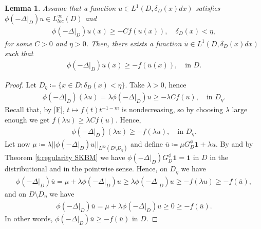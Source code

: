 \documentclass[12pt,a4paper,onecolumn]{amsart}
\newtheorem{lem}[thm]{Lemma}
\theoremstyle{definition}
\newcommand{\1}{\mathbf 1}
\newcommand{\LLL}{L^1(D,\de(x)dx)}
\newcommand{\Lo}{\phi(-\left.\Delta\right\vert_{D})}
\newcommand{\GDfi}{G^\phi_{ D}}
\newcommand{\GDFI}{\GDfi}
\newcommand{\de}{\delta_D}
\numberwithin{equation}{section}
\begin{document}
\begin{lem}\label{l:supersol lem2}
	Assume that a function $u\in\LLL$ satisfies $\Lo u\in L^\infty_{loc}(D)$ and 
	\begin{align*}
		\Lo u(x)\ge - Cf(u(x)),\quad \de(x)< \eta ,
	\end{align*}
    for some $C>0$ and $\eta>0$. Then, there exists a function $\overline u\in \LLL$ such that 
	\begin{align*}
		\Lo \overline u(x)\ge - f(\overline u(x)),\quad \text{in $D$.}
	\end{align*}
\end{lem}
\begin{proof}
	Let $ D_\eta \coloneqq \{x\in D: \de(x)< \eta\}$. Take $\lambda>0$, hence
	\begin{align*}
		\Lo (\lambda u)=\lambda \Lo u\ge -\lambda C f(u),\quad \text{in $D_\eta$}.
	\end{align*}
Recall that, by \ref{F}, $t\mapsto f(t)t^{-1-m}$ is nondecreasing, so by choosing $\lambda$ large enough we get $f(\lambda u)\ge \lambda C f(u)$.
    Hence, 
	\begin{align*}
		\Lo (\lambda u)\ge -f(\lambda u),\quad \text{in $D_\eta$}.
	\end{align*}
	Let now $\mu\coloneqq\lambda||\Lo u||_{L^\infty(D\setminus D_\eta)}$ and define $\overline u\coloneqq \mu\GDFI\1 +\lambda u$. By \cite[Proposition 2.14]{Bio23} and by Theorem \ref{t:regularity SKBM} we have $\Lo \GDFI \1=\1$ in $D$ in the distributional and in the pointwise sense. Hence, on $D_\eta$ we have
	\begin{align*}
		\Lo \overline u = \mu + \lambda \Lo u\ge \lambda \Lo u\ge - f(\lambda u)\ge - f(\overline u),
	\end{align*}
	and on $D\setminus  D_\eta$  we have
	\begin{align*}
		\Lo \overline u = \mu + \lambda \Lo u\ge 0\ge - f(\overline u).
	\end{align*}
	In other words, $\Lo\overline u\ge -f(\overline u)$ in $D$.
\end{proof}
\end{document}
